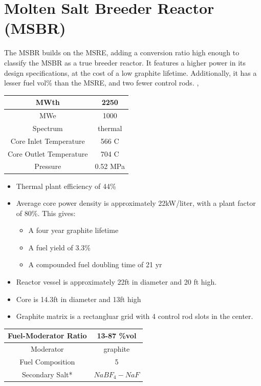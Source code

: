 \documentclass[letterpaper]{article}
\begin{document}
\section{Molten Salt Breeder Reactor (MSBR)}
The MSBR builds on the MSRE, adding a conversion ratio high enough to classify the MSBR as a true breeder reactor.  It features a higher power in its design specifications, at the cost of a low graphite lifetime.  Additionally, it has a lesser fuel vol\% than the MSRE, and two fewer control rods. \cite{bettis_design_1970}, \cite{whatley_engineering_1970}

\begin{center}
\begin{tabular}{|c|c|}
\hline
MWth & 2250 \\
\hline
MWe & 1000 \\
\hline
Spectrum & thermal \\
\hline
Core Inlet Temperature & 566 C \\
\hline
Core Outlet Temperature & 704 C\\
\hline
Pressure & 0.52 MPa \\
\hline
\end{tabular}
\end{center}

\begin{itemize}
\item Thermal plant efficiency of 44\%
\item Average core power density is approximately 22kW/liter, with a plant factor of 80\%.  This gives:
	\begin{itemize}
	\item A four year graphite lifetime
	\item A fuel yield of 3.3\%
	\item A compounded fuel doubling time of 21 yr
	\end{itemize}
\item Reactor vessel is approximately 22ft in diameter and 20 ft high.
\item Core is 14.3ft in diameter and 13ft high
\item Graphite matrix is a rectangluar grid with 4 control rod slots in the center.
\end{itemize}

\begin{center}
\begin{tabular}{|c|c|}
\hline
Fuel-Moderator Ratio & 13-87 \%vol \\
\hline
Moderator & graphite \\
\hline
Fuel Composition & 5 \\
\hline
Secondary Salt* & $NaBF_4-NaF$ \\
\hline
\end{tabular}
\end{center}
\end{document}
